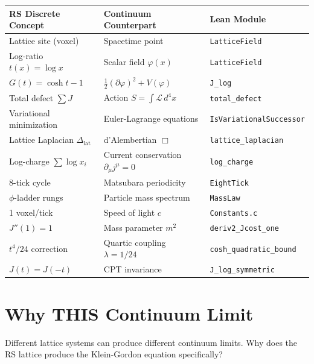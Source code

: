 \documentclass[11pt,a4paper]{article}
\theoremstyle{plain}
\theoremstyle{definition}
\theoremstyle{remark}
\newcommand{\Jcost}{J}
\newcommand{\Jlog}{G}
\newcommand{\Lap}{\Delta_{\mathrm{lat}}}
\begin{document}
\begin{center}
\begin{tabular}{@{}lll@{}}
\toprule
\textbf{RS Discrete Concept} & \textbf{Continuum Counterpart} & \textbf{Lean Module} \\
\midrule
Lattice site (voxel) & Spacetime point & \texttt{LatticeField} \\
Log-ratio $t(x) = \log x$ & Scalar field $\varphi(x)$ & \texttt{LatticeField} \\
$\Jlog(t) = \cosh t - 1$ & $\frac12(\partial\varphi)^2 + V(\varphi)$ & \texttt{J\_log} \\
Total defect $\sum \Jcost$ & Action $S = \int \mathcal{L}\,d^4x$ & \texttt{total\_defect} \\
Variational minimization & Euler-Lagrange equations & \texttt{IsVariationalSuccessor} \\
Lattice Laplacian $\Lap$ & d'Alembertian $\Box$ & \texttt{lattice\_laplacian} \\
Log-charge $\sum \log x_i$ & Current conservation $\partial_\mu j^\mu = 0$ & \texttt{log\_charge} \\
8-tick cycle & Matsubara periodicity & \texttt{EightTick} \\
$\phi$-ladder rungs & Particle mass spectrum & \texttt{MassLaw} \\
1 voxel/tick & Speed of light $c$ & \texttt{Constants.c} \\
$J''(1) = 1$ & Mass parameter $m^2$ & \texttt{deriv2\_Jcost\_one} \\
$t^4/24$ correction & Quartic coupling $\lambda = 1/24$ & \texttt{cosh\_quadratic\_bound} \\
$J(t) = J(-t)$ & CPT invariance & \texttt{J\_log\_symmetric} \\
\bottomrule
\end{tabular}
\end{center}

\section{Why THIS Continuum Limit}
\label{sec:why-this}

Different lattice systems can produce different continuum limits.
Why does the RS lattice produce the Klein-Gordon equation specifically?
\end{document}
